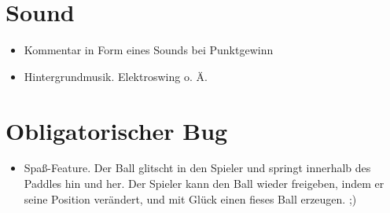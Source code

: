 \documentclass[a4paper, 10pt]{article}
\begin{document}
\section{Sound}
\begin{itemize}
\item Kommentar in Form eines Sounds bei Punktgewinn
\item Hintergrundmusik. Elektroswing o. Ä.
\end{itemize}

\section{Obligatorischer Bug}
\begin{itemize}
\item Spaß-Feature. Der Ball glitscht in den Spieler und springt innerhalb des Paddles hin und her. Der Spieler kann den Ball wieder freigeben, indem er seine Position verändert, und mit Glück einen fieses Ball erzeugen. ;)
\end{itemize}
\bigskip
\end{document}
